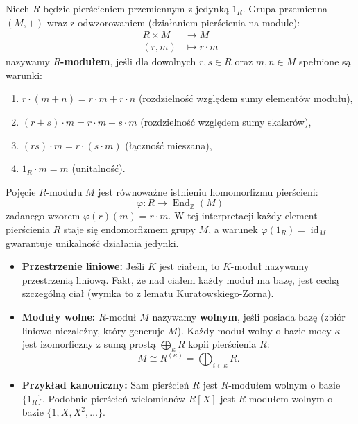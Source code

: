 \begin{definition}[$R$-moduł]
Niech $R$ będzie pierścieniem przemiennym z jedynką $1_R$. Grupa przemienna $(M, +)$ wraz z odwzorowaniem (działaniem pierścienia na module):
\begin{align*}
R \times M &\longrightarrow M \\
(r, m) &\longmapsto r \cdot m
\end{align*}
nazywamy \textbf{$R$-modułem}, jeśli dla dowolnych $r, s \in R$ oraz $m, n \in M$ spełnione są warunki:
\begin{enumerate}[label=\roman*)]
\item $r \cdot (m + n) = r \cdot m + r \cdot n$ \quad (rozdzielność względem sumy elementów modułu),
\item $(r + s) \cdot m = r \cdot m + s \cdot m$ \quad (rozdzielność względem sumy skalarów),
\item $(r s) \cdot m = r \cdot (s \cdot m)$ \quad (łączność mieszana),
\item $1_R \cdot m = m$ \quad (unitalność).
\end{enumerate}
\end{definition}

\begin{theorem}
Pojęcie $R$-modułu $M$ jest równoważne istnieniu homomorfizmu pierścieni:
\[
\varphi: R \to \operatorname{End}_{\mathbb{Z}}(M)
\]
zadanego wzorem $\varphi(r)(m) = r \cdot m$. W tej interpretacji każdy element pierścienia $R$ staje się endomorfizmem grupy $M$, a warunek $\varphi(1_R) = \operatorname{id}_M$ gwarantuje unikalność działania jedynki.
\end{theorem}

\begin{remark}
\begin{itemize}
\item \textbf{Przestrzenie liniowe:} Jeśli $K$ jest ciałem, to $K$-moduł nazywamy przestrzenią liniową. Fakt, że nad ciałem każdy moduł ma bazę, jest cechą szczególną ciał (wynika to z lematu Kuratowskiego-Zorna).
\item \textbf{Moduły wolne:} $R$-moduł $M$ nazywamy \textbf{wolnym}, jeśli posiada bazę (zbiór liniowo niezależny, który generuje $M$). Każdy moduł wolny o bazie mocy $\kappa$ jest izomorficzny z sumą prostą $\bigoplus_{\kappa} R$ kopii pierścienia $R$:
\[
M \cong R^{(\kappa)} = \bigoplus_{i \in \kappa} R.
\]
\item \textbf{Przykład kanoniczny:} Sam pierścień $R$ jest $R$-modułem wolnym o bazie $\{1_R\}$. Podobnie pierścień wielomianów $R[X]$ jest $R$-modułem wolnym o bazie $\{1, X, X^2, \dots\}$.
\end{itemize}
\end{remark}

